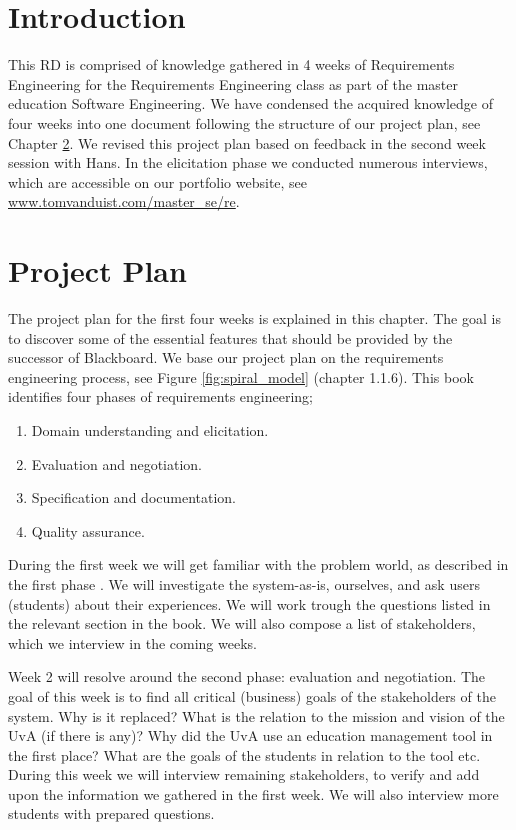 \chapter{Introduction}
This RD is comprised of knowledge gathered in 4 weeks of Requirements Engineering for the Requirements Engineering class as part of the master education Software Engineering. We have condensed the acquired knowledge of four weeks into one document following the structure of our project plan, see Chapter \ref{pp}. We revised this project plan based on feedback in the second week session with Hans. In the elicitation phase we conducted numerous interviews, which are accessible on our portfolio website, see \url{www.tomvanduist.com/master_se/re}.

\chapter{Project Plan}
\label{pp}
The project plan for the first four weeks is explained in this chapter. The goal is to discover some of the essential features that should be provided by the successor of Blackboard. We base our project plan on the requirements engineering process, see Figure \ref{fig:spiral_model} \cite{RE_book} (chapter 1.1.6). This book identifies four phases of requirements engineering; 

\begin{enumerate}
	\item Domain understanding and elicitation.
	\item Evaluation and negotiation.
	\item Specification and documentation.
	\item Quality assurance.
\end{enumerate}

During the first week we will get familiar with the problem world, as described in the first phase \cite{RE_book}. We will investigate the system-as-is, ourselves, and ask users (students) about their experiences. We will work trough the questions listed in the relevant section in the book. We will also compose a list of stakeholders, which we interview in the coming weeks.

Week 2 will resolve around the second phase: evaluation and negotiation. The goal of this week is to find all critical (business) goals of the stakeholders of the system. Why is it replaced? What is the relation to the mission and vision of the UvA (if there is any)? Why did the UvA use an education management tool in the first place? What are the goals of the students in relation to the tool etc. During this week we will interview remaining stakeholders, to verify and add upon the information we gathered in the first week. We will also interview more students with prepared questions.

